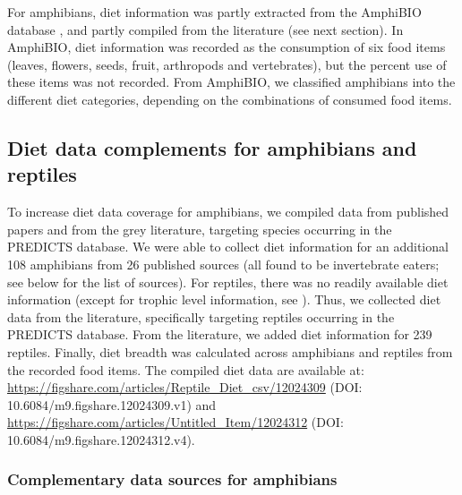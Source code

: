 \documentclass[11pt]{article}
\begin{document}
For amphibians, diet information was partly extracted from the AmphiBIO database \citep{Oliveira2017}, and partly compiled from the literature (see next section). In AmphiBIO, diet information was recorded as the consumption of six food items (leaves, flowers, seeds, fruit, arthropods and vertebrates), but the percent use of these items was not recorded. From AmphiBIO, we classified amphibians into the different diet categories, depending on the combinations of consumed food items. 

\subsection{Diet data complements for amphibians and reptiles}
To increase diet data coverage for amphibians, we compiled data from published papers and from the grey literature, targeting species occurring in the PREDICTS database. We were able to collect diet information for an additional 108 amphibians from 26 published sources (all found to be invertebrate eaters; see below for the list of sources). For reptiles, there was no readily available diet information (except for trophic level information, see \citet{Etard2020}). Thus, we collected diet data from the literature, specifically targeting reptiles occurring in the PREDICTS database. From the literature, we added diet information for 239 reptiles. Finally, diet breadth was calculated across amphibians and reptiles from the recorded food items. The compiled diet data are available at:
\url{https://figshare.com/articles/Reptile_Diet_csv/12024309} (DOI: 10.6084/m9.figshare.12024309.v1) and
\url{https://figshare.com/articles/Untitled_Item/12024312} (DOI: 10.6084/m9.figshare.12024312.v4).

\subsubsection{Complementary data sources for amphibians}
\end{document}
